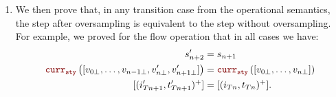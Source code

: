 \begin{skippableproof}
\begin{enumerate}
        \item We then prove that, in any transition case from the operational semantics, the step
              after oversampling is equivalent to the step without oversampling.
              For example, we proved for the  flow operation that in all cases we
              have:
              \begin{align*}
                  s'_{n+2}                                                                 & = s_{n+1}                                      \\
                  \CurrVal{sty}{[v_{0\bot}, \dots, v_{n-1\bot}, v'_{n\bot}, v'_{n+1\bot}]} & = \CurrVal{sty}{[v_{0\bot}, \dots, v_{n\bot}]} \\
                  [(i'_{Tn+1}, t'_{Tn+1})^+]                                               & = [(i_{Tn}, t_{Tn})^+].
              \end{align*}
    \end{enumerate}

    \setcounter{paragraph}{0}
\end{skippableproof}


